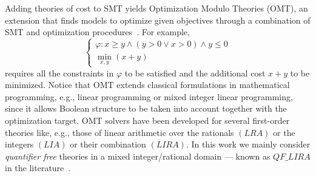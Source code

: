 Adding theories of cost to SMT yields Optimization Modulo Theories
(OMT), an extension that finds models
to optimize given objectives through a combination of SMT and optimization 
procedures~\cite{sebastiani2012optimization}. For example,
\begin{equation*}
	\left\{
	\begin{array}{l}
		\varphi : x \geq y \wedge (y > 0 \vee x > 0) \wedge y \leq 0 \\
		\min_{x,y} ( x + y )
	\end{array}
	\right.
\end{equation*}
requires all the constraints in $\varphi$ to be satisfied
and the additional cost $x + y$ to be minimized.
Notice that OMT extends classical formulations  
in mathematical programming, e.g., linear programming or mixed integer
linear programming, since it allows Boolean structure to be taken into
account  together with the optimization target. OMT solvers have been
developed for several first-order theories like, e.g., those of
linear arithmetic over the rationals $(LRA)$ or the integers
$(LIA)$ or their combination $(LIRA)$. In this work we mainly
consider \textit{quantifier free} theories in a mixed 
integer/rational domain --- known as $QF\_LIRA$ in the
literature~\cite{barrett2018satisfiability}.